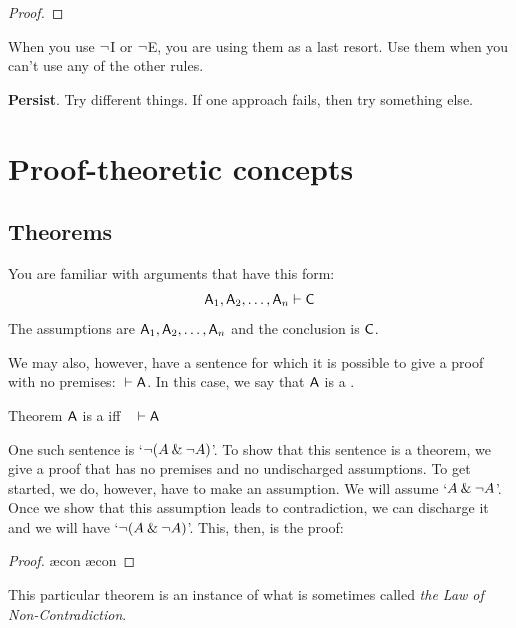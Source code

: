 \begin{earg}
\begin{proof}
	 \pr{}
	\open
		\as{}
	\close
	\ci{}
\end{proof}

\medskip

\item[\ex{18-7}] When you use ${\neg}$I or ${\neg}$E, you are using them as a last resort. Use them when you can't use any of the other rules.
\medskip

\item[\ex{18-8}] \textbf{Persist}. Try different things. If one approach fails, then try something else.
\end{earg}




\chapter{Proof-theoretic concepts}\label{s:ProofTheoreticConcepts}

\section{Theorems}

You are familiar with arguments that have this form:
$$\mathsf{A}_1, \mathsf{A}_2, \ldots, \mathsf{A}_n \vdash \mathsf{C}$$
The assumptions are $\mathsf{A}_1, \mathsf{A}_2, \ldots, \mathsf{A}_n$ and the conclusion is $\mathsf{C}$.  

We may also, however, have a sentence for which it is possible to give a proof with no premises: ${} \vdash \mathsf{A}$. In this case, we say that $\mathsf{A}$ is a .

\begin{factboxy}{Theorem}\label{def:syntactic_tautology_in_sl}
		$\mathsf{A}$ is a  iff ~ $\vdash \mathsf{A}$
\end{factboxy}

One such sentence is `${\neg} (A \mathbin{\&} {\neg} A)$'. To show that this sentence is a theorem, we give a proof that has no premises and no undischarged assumptions. To get started, we do, however, have to make an assumption. We will assume `$A \mathbin{\&} {\neg} A$'. Once we show that this assumption leads to contradiction, we can discharge it and we will have `${\neg} (A \mathbin{\&} {\neg} A)$'. This, then, is the proof:
	\begin{proof}
		\open
			\ae{con}
			\ae{con}
		\close
	\end{proof}
This particular theorem is an instance of what is sometimes called \emph{the Law of Non-Contradiction}.

